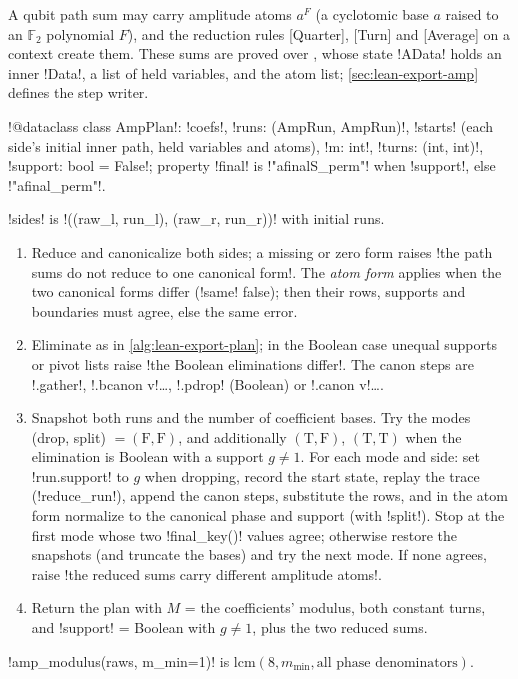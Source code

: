 {{{A qubit path sum may carry amplitude atoms $a^{F}$ (a cyclotomic base $a$ raised to an $\mathbb{F}_2$
polynomial $F$), and the reduction rules [Quarter], [Turn] and [Average] on a context create
them. These sums are proved over , whose state \lexlean!AData!
holds an inner \lexlean!Data!, a list of held variables, and the atom list; \cref{sec:lean-export-amp}
defines the step writer.

\begin{signature}
\lexpy!@dataclass class AmpPlan!: \lexpy!coefs!, \lexpy!runs: (AmpRun, AmpRun)!, \lexpy!starts! (each side's
initial inner path, held variables and atoms), \lexpy!m: int!, \lexpy!turns: (int, int)!,
\lexpy!support: bool = False!; property \lexpy!final! is \lexcode!"afinalS_perm"! when \lexpy!support!, else
\lexcode!"afinal_perm"!.
\end{signature}

\begin{algorithm}\label{alg:lean-export-amp-plan}
\lexpy!sides! is \lexpy!((raw_l, run_l), (raw_r, run_r))! with initial runs.
\begin{enumerate}
\item Reduce and canonicalize both sides; a missing or zero form raises \lexcode!the path sums do not reduce to one canonical form!. The \emph{atom form} applies when the two canonical forms
differ (\lexpy!same! false); then their rows, supports and boundaries must agree, else the same
error.
\item Eliminate as in \cref{alg:lean-export-plan}; in the Boolean case unequal supports or pivot
lists raise \lexcode!the Boolean eliminations differ!. The canon steps are \lexlean!.gather!,
\lexlean!.bcanon v!\ldots, \lexlean!.pdrop! (Boolean) or \lexlean!.canon v!\ldots.
\item Snapshot both runs and the number of coefficient bases. Try the modes
(drop, split) $=(\mathrm{F},\mathrm{F})$, and additionally $(\mathrm{T},\mathrm{F})$,
$(\mathrm{T},\mathrm{T})$ when the elimination is Boolean with a support $g\neq 1$. For each
mode and side: set \lexpy!run.support! to $g$ when dropping, record the start state, replay the
trace (\lexpy!reduce_run!), append the canon steps, substitute the rows, and in the atom form
normalize to the canonical phase and support (with \lexcode!split!). Stop at the first mode whose
two \lexpy!final_key()! values agree; otherwise restore the snapshots (and truncate the bases) and
try the next mode. If none agrees, raise \lexcode!the reduced sums carry different amplitude atoms!.
\item Return the plan with $M$ = the coefficients' modulus, both constant turns, and
\lexpy!support! = Boolean with $g\neq 1$, plus the two reduced sums.
\end{enumerate}
\end{algorithm}
\lexpy!amp_modulus(raws, m_min=1)! is $\mathrm{lcm}(8, m_{\min}, \text{all phase denominators})$.

}}}
